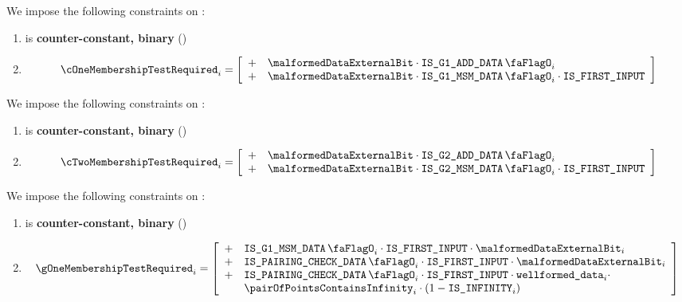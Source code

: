 
We impose the following constraints on \cOneMembershipTestRequired{}:
\begin{enumerate}
    \item \cOneMembershipTestRequired{} is \textbf{counter-constant, binary} \quad (\trash)
    \item
        \[  
            \cOneMembershipTestRequired_{i} = 
            \left[ \begin{array}{clcr}
              + & \malformedDataExternalBit \cdot \isBlsGOneAddData_{i} \\
              + & \malformedDataExternalBit \cdot \isBlsGOneMsmData_{i} \cdot \isFirstInput \\
            \end{array} \right] \vspace{2mm}  
        \]
\end{enumerate}
\noindent
We impose the following constraints on \cTwoMembershipTestRequired{}:
\begin{enumerate}
    \item \cTwoMembershipTestRequired{} is \textbf{counter-constant, binary} \quad (\trash)
    \item 
    \[  
        \cTwoMembershipTestRequired_{i} = 
        \left[ \begin{array}{clcr}
          + & \malformedDataExternalBit \cdot \isBlsGTwoAddData_{i} \\
          + & \malformedDataExternalBit \cdot \isBlsGTwoMsmData_{i} \cdot \isFirstInput \\
        \end{array} \right] \vspace{2mm}  
    \]
\end{enumerate}
\noindent
We impose the following constraints on \gOneMembershipTestRequired{}:
\begin{enumerate}
    \item \gOneMembershipTestRequired{} is \textbf{counter-constant, binary} \quad (\trash)
    \item 
        \[
            \gOneMembershipTestRequired_{i} = 
                \left[ \begin{array}{cl} 
                    + & \isBlsGOneMsmData_{i} \cdot \isFirstInput \cdot \malformedDataExternalBit_{i}  \\
                    + & \isBlsPairingCheckData_{i} \cdot \isFirstInput \cdot \malformedDataExternalBit_{i} \\
                    + & \isBlsPairingCheckData_{i} \cdot \isFirstInput \cdot \locWellformedData_{i} \cdot \\
                      & \pairOfPointsContainsInfinity_{i} \cdot (1 - \isInfinity_{i}) \\
                \end{array} \right] \\
        \]
\end{enumerate}
